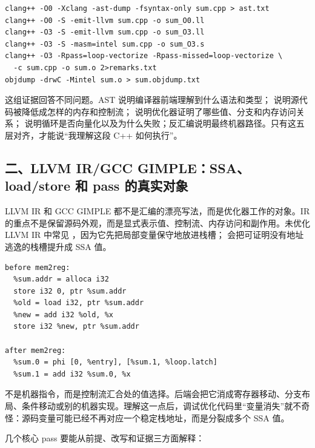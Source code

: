 \begin{lstlisting}[numbers=none,caption={同一函数的编译器证据链}]
clang++ -O0 -Xclang -ast-dump -fsyntax-only sum.cpp > ast.txt
clang++ -O0 -S -emit-llvm sum.cpp -o sum_O0.ll
clang++ -O3 -S -emit-llvm sum.cpp -o sum_O3.ll
clang++ -O3 -S -masm=intel sum.cpp -o sum_O3.s
clang++ -O3 -Rpass=loop-vectorize -Rpass-missed=loop-vectorize \
  -c sum.cpp -o sum.o 2>remarks.txt
objdump -drwC -Mintel sum.o > sum.objdump.txt
\end{lstlisting}

这组证据回答不同问题。AST 说明编译器前端理解到什么语法和类型； 说明源代码被降低成怎样的内存和控制流； 说明优化器证明了哪些值、分支和内存访问关系； 说明循环是否向量化以及为什么失败；反汇编说明最终机器路径。只有这五层对齐，才能说“我理解这段 C++ 如何执行”。

\subsection{二、LLVM IR/GCC GIMPLE：SSA、load/store 和 pass 的真实对象}

LLVM IR 和 GCC GIMPLE 都不是汇编的漂亮写法，而是优化器工作的对象。IR 的重点不是保留源码外观，而是显式表示值、控制流、内存访问和副作用。未优化 LLVM IR 中常见 ，因为它先把局部变量保守地放进栈槽； 会把可证明没有地址逃逸的栈槽提升成 SSA 值。

\begin{lstlisting}[numbers=none,caption={mem2reg 前后的直觉}]
before mem2reg:
  %sum.addr = alloca i32
  store i32 0, ptr %sum.addr
  %old = load i32, ptr %sum.addr
  %new = add i32 %old, %x
  store i32 %new, ptr %sum.addr

after mem2reg:
  %sum.0 = phi [0, %entry], [%sum.1, %loop.latch]
  %sum.1 = add i32 %sum.0, %x
\end{lstlisting}

 不是机器指令，而是控制流汇合处的值选择。后端会把它消成寄存器移动、分支布局、条件移动或别的机器实现。理解这一点后，调试优化代码里“变量消失”就不奇怪：源码变量可能已经不再对应一个稳定栈地址，而是分裂成多个 SSA 值。

几个核心 pass 要能从前提、改写和证据三方面解释：

